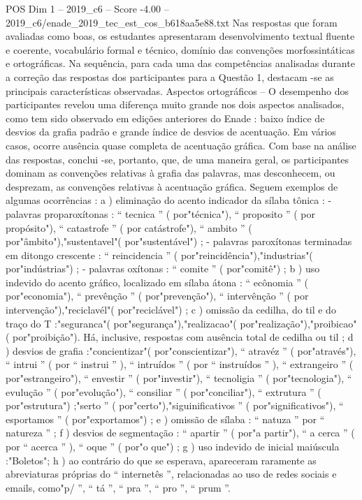 \begin{textsample}{POS Dim 1 – 2019\_c6 – Score -4.00 – 2019\_c6/enade\_2019\_tec\_est\_cos\_b618aa5e88.txt}
Nas respostas que foram avaliadas como boas, os estudantes apresentaram desenvolvimento textual fluente e coerente, vocabulário formal e técnico, domínio das convenções morfossintáticas e ortográficas.
Na sequência, para cada uma das competências analisadas durante a correção das respostas dos participantes para a Questão 1, destacam -se as principais características observadas.
Aspectos ortográficos – O desempenho dos participantes revelou uma diferença muito grande nos dois aspectos analisados, como tem sido observado em edições anteriores do Enade : baixo índice de desvios da grafia padrão e grande índice de desvios de acentuação.
Em vários casos, ocorre ausência quase completa de acentuação gráfica.
Com base na análise das respostas, conclui -se, portanto, que, de uma maneira geral, os participantes dominam as convenções relativas à grafia das palavras, mas desconhecem, ou desprezam, as convenções relativas à acentuação gráfica.
Seguem exemplos de algumas ocorrências : a ) eliminação do acento indicador da sílaba tônica : - palavras proparoxítonas : “ tecnica ” ( por"técnica"), “ proposito ” ( por propósito"), “ catastrofe ” ( por catástrofe"), “ ambito ” ( por"âmbito"),"sustentavel"( por"sustentável") ; - palavras paroxítonas terminadas em ditongo crescente : “ reincidencia ” ( por"reincidência"),"industrias"( por"indústrias") ; - palavras oxítonas : “ comite ” ( por"comitê") ; b ) uso indevido do acento gráfico, localizado em sílaba átona : “ ecônomia ” ( por"economia"), “ prevênção ” ( por"prevenção"), “ intervênção ” ( por intervenção"),"reciclavél"( por"reciclável") ; c ) omissão da cedilha, do til e do traço do T :"seguranca"( por"segurança"),"realizacao"( por"realização"),"proibicao"( por"proibição").
Há, inclusive, respostas com ausência total de cedilha ou til ; d ) desvios de grafia :"concientizar"( por"conscientizar"), “ atravéz ” ( por"através"), “ intrui ” ( por “ instrui ” ), “ intruídos ” ( por “ instruídos ” ), “ extrangeiro ” ( por"estrangeiro"), “ envestir ” ( por"investir"), “ tecnoligia ” ( por"tecnologia"), “ evulução ” ( por"evolução"), “ consiliar ” ( por"conciliar"), “ extrutura ” ( por"estrutura") ;"serto ” ( por"certo"),"siguinificativos ” ( por"significativos"), “ esportamos ” ( por"exportamos") ; e ) omissão de sílaba : “ natuza ” por “ natureza ” ; f ) desvios de segmentação : “ apartir ” ( por"a partir"), “ a cerca ” ( por “ acerca ” ), “ oque ” ( por"o que") ; g ) uso indevido de inicial maiúscula :"Boletos"; h ) ao contrário do que se esperava, apareceram raramente as abreviaturas próprias do “ internetês ”, relacionadas ao uso de redes sociais e emails, como"p/ ”, “ tá ”, “ pra ”, “ pro ”, “ prum ”.

\end{textsample}
